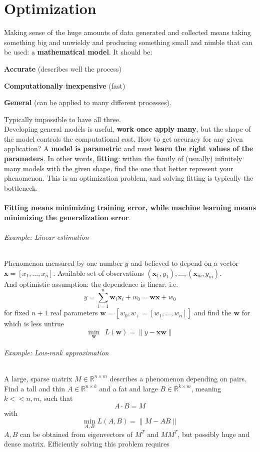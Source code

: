 \documentclass[10pt]{report}
\begin{document}
\chapter{Optimization}
Making sense of the huge amounts of data generated and collected means taking something big and unwieldy and producing something small and nimble that can be used: a \textbf{mathematical model}. It should be:\begin{list}{}{}
	\item \textbf{Accurate} (describes well the process)
	\item \textbf{Computationally inexpensive} (fast)
	\item \textbf{General} (can be applied to many different processes).
\end{list}
Typically impossible to have all three.\\
Developing general models is useful, \textbf{work once apply many}, but the shape of the model controls the computational cost. How to get accuracy for any given application? A \textbf{model is parametric} and must \textbf{learn the right values of the parameters}. In other words, \textbf{fitting}: within the family of (usually) infinitely many models with the given shape, find the one that better represent your phenomenon. This is an optimization problem, and solving fitting is typically the bottleneck.\\\\
\textbf{Fitting means minimizing training error, while machine learning means minimizing the generalization error}.
\subparagraph{Example: Linear estimation} Phenomenon measured by one number $y$ and believed to depend on a vector $\mathbf{x} = [x_1,\ldots,x_n]$. Available set of observations $(\mathbf{x}_1,y_1), \ldots, (\mathbf{x}_m, y_m)$.\\
And optimistic assumption: the dependence is linear, i.e. $$y = \sum_{i=1}^n \mathbf{w}_i\mathbf{x}_i+w_0 = \mathbf{wx} + w_0$$ for fixed $n+1$ real parameters $\mathbf{w} = [w_0, w_+=[w_1,\ldots,w_n]]$ and find the $\mathbf{w}$ for which is less untrue $$\min_\mathbf{w}\:\:L(\mathbf{w})=\|y-\mathbf{xw}\|$$
\subparagraph{Example: Low-rank approximation} A large, sparse matrix $M\in \mathbb{R}^{n\times m}$ describes a phenomenon depending on pairs. Find a tall and thin $A\in \mathbb{R}^{n\times k}$ and a fat and large $B\in \mathbb{R}^{k\times m}$, meaning $k << n,m$, such that $$A\cdot B = M$$ with $$\min_{A,B} L(A,B) = \|M-AB\|$$
$A,B$ can be obtained from eigenvectors of $M^T$ and $MM^T$, but possibly huge and dense matrix. Efficiently solving this problem requires
\end{document}
